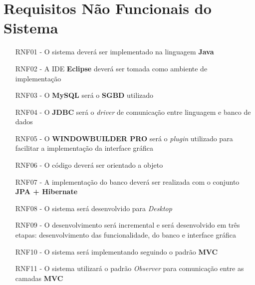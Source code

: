 \section{Requisitos Não Funcionais do Sistema}


\begin{itemize}

\item[RNF01 -] O sistema deverá ser implementado na linguagem \textbf{Java}
\item[RNF02 -] A IDE \textbf{Eclipse} deverá ser tomada como ambiente de implementação
\item[RNF03 -] O \textbf{MySQL} será o \textbf{SGBD} utilizado
\item[RNF04 -] O \textbf{JDBC} será o \textit{driver} de comunicação entre linguagem e banco de dados
\item[RNF05 -] O \textbf{WINDOWBUILDER PRO} será o \textit{plugin} utilizado para facilitar a implementação da interface gráfica
\item[RNF06 -] O código deverá ser orientado a objeto
\item[RNF07 -] A implementação do banco deverá ser realizada com o conjunto \textbf{JPA + Hibernate}
\item[RNF08 -] O sistema será desenvolvido para \textit{Desktop}
\item[RNF09 -] O desenvolvimento será incremental e será desenvolvido em três etapas: desenvolvimento das funcionalidade, do banco e interface gráfica
\item[RNF10 -] O sistema será implementando seguindo o padrão \textbf{MVC}
\item[RNF11 -] O sistema utilizará o padrão \textit{Observer} para comunicação entre as camadas \textbf{MVC}
\end{itemize}

